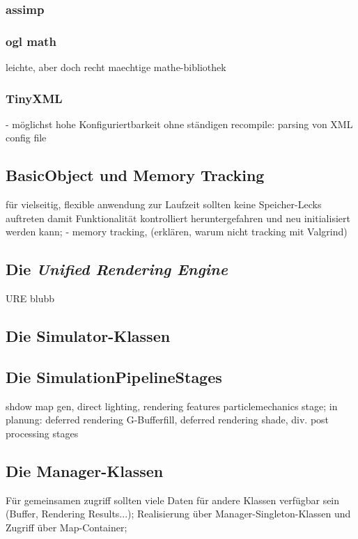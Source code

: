     \subsubsection{assimp}
    \subsubsection{ogl math}
    	leichte, aber doch recht maechtige mathe-bibliothek
    \subsubsection{TinyXML}
    - möglichst hohe Konfiguriertbarkeit ohne ständigen recompile: parsing von XML config file
    	
 
\subsection{BasicObject und Memory Tracking}
	 für vielseitig, flexible anwendung zur Laufzeit sollten keine 	Speicher-Lecks auftreten damit Funktionalität 
	 kontrolliert heruntergefahren und neu initialisiert werden kann; 
	 	- memory tracking, (erklären, warum nicht tracking mit Valgrind)
 
    	
\subsection{Die \emph{Unified Rendering Engine}}
URE blubb

\subsection{Die Simulator-Klassen}


\subsection{Die SimulationPipelineStages}
	shdow map gen, direct lighting, rendering features particlemechanics stage;
	in planung: deferred rendering G-Bufferfill, deferred rendering shade, div. post processing stages


\subsection{Die Manager-Klassen}
Für gemeinsamen zugriff sollten viele Daten für andere Klassen verfügbar sein (Buffer, Rendering Results...); 	
Realisierung über Manager-Singleton-Klassen und Zugriff über Map-Container;

